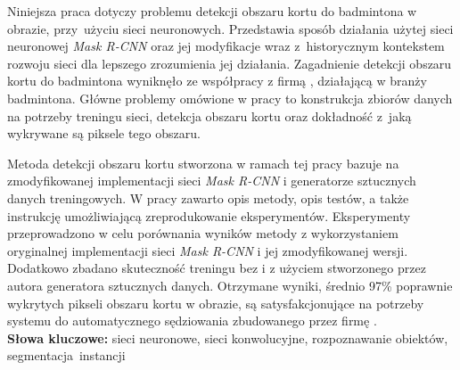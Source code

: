 Niniejsza praca dotyczy problemu detekcji obszaru kortu do badmintona w obrazie, przy~użyciu sieci neuronowych.
Przedstawia sposób działania użytej sieci neuronowej \textit{Mask R-CNN} oraz jej modyfikacje wraz z~historycznym kontekstem rozwoju sieci dla lepszego zrozumienia jej działania.
Zagadnienie detekcji obszaru kortu do badmintona wyniknęło ze współpracy z firmą \blue{}, działającą w branży badmintona.
Główne problemy omówione w pracy to konstrukcja zbiorów danych na potrzeby treningu sieci, detekcja obszaru kortu oraz dokładność z~jaką wykrywane są piksele tego obszaru.

Metoda detekcji obszaru kortu stworzona w ramach tej pracy bazuje na zmodyfikowanej implementacji sieci \textit{Mask R-CNN} i generatorze sztucznych danych treningowych.
W pracy zawarto opis metody, opis testów, a także instrukcję umożliwiającą zreprodukowanie eksperymentów. Eksperymenty przeprowadzono w celu porównania wyników metody z wykorzystaniem oryginalnej implementacji sieci \textit{Mask R-CNN} i jej zmodyfikowanej wersji.
Dodatkowo zbadano skuteczność treningu bez i z użyciem stworzonego przez autora generatora sztucznych danych. Otrzymane wyniki, średnio 97\% poprawnie wykrytych pikseli obszaru kortu w obrazie, są satysfakcjonujące na potrzeby systemu do automatycznego sędziowania zbudowanego przez firmę \blue{}.
\\

\noindent \textbf{Słowa kluczowe:} sieci neuronowe, sieci konwolucyjne, rozpoznawanie obiektów, segmentacja~instancji
